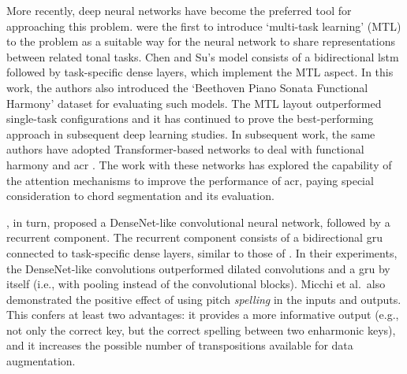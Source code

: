 More recently, deep neural networks have become the
preferred tool for approaching this problem.
\textcite{chen2018functional} were the first to introduce
`multi-task learning' (MTL) \parencite{ruder2017overview} to
the problem as a suitable way for the neural network to
share representations between related tonal tasks. Chen and
Su's model consists of a bidirectional \gls{lstm}
\parencite{hochreiter1997long} followed by task-specific
dense layers, which implement the MTL aspect. In this work,
the authors also introduced the `Beethoven Piano Sonata
Functional Harmony' dataset for evaluating such models. The
MTL layout outperformed single-task configurations and it
has continued to prove the best-performing approach in
subsequent deep learning studies. In subsequent work, the
same authors have adopted Transformer-based networks to deal
with functional harmony and \gls{acr}
\parencite{chen2019harmony, chen2021attend}. The work with
these networks has explored the capability of the attention
mechanisms to improve the performance of \gls{acr}, paying
special consideration to chord segmentation and its
evaluation.

\textcite{micchi2020not}, in turn, proposed a DenseNet-like
\parencite{huang2017densely} convolutional neural network,
followed by a recurrent component. The recurrent component
consists of a bidirectional \gls{gru}
\parencite{cho2014learning} connected to task-specific dense
layers, similar to those of \textcite{chen2018functional}.
In their experiments, the DenseNet-like convolutions
outperformed dilated convolutions and a \gls{gru} by itself
(i.e., with pooling instead of the convolutional blocks).
Micchi et al.~also demonstrated the positive effect of using
pitch \textit{spelling} in the inputs and outputs. This
confers at least two advantages: it provides a more
informative output (e.g., not only the correct key, but the
correct spelling between two enharmonic keys), and it
increases the possible number of transpositions available
for data augmentation.


